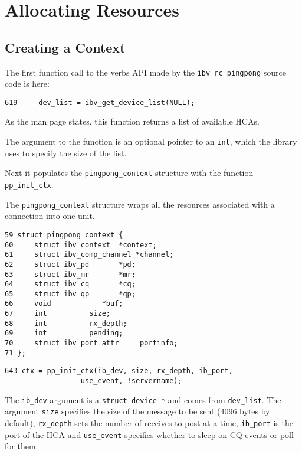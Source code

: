 \documentclass[letterpaper,12pt]{article}
\begin{document}
\section{Allocating Resources}

\subsection{Creating a Context} The first function call to the verbs API
made by the {\tt ibv\_rc\_pingpong} source code is here:

\lstset{language=C, caption=,basicstyle=\footnotesize}
\begin{lstlisting}
619     dev_list = ibv_get_device_list(NULL);
\end{lstlisting}

As the man page states, this function returns a list of available HCAs.

The argument to the function is an optional pointer to an {\tt int},
which the library uses to specify the size of the list.

Next it populates the {\tt pingpong\_context} structure with the function
{\tt pp\_init\_ctx}.

The {\tt pingpong\_context} structure wraps all the resources associated with
a connection into one unit.

\lstset{language=C, caption=struct pingpong\_context}
\begin{lstlisting}
59 struct pingpong_context {
60     struct ibv_context  *context;
61     struct ibv_comp_channel *channel;
62     struct ibv_pd       *pd;
63     struct ibv_mr       *mr;
64     struct ibv_cq       *cq;
65     struct ibv_qp       *qp;
66     void            *buf;
67     int          size;
68     int          rx_depth;
69     int          pending;
70     struct ibv_port_attr     portinfo;
71 };
\end{lstlisting}


\lstset{language=C, caption=Initializing the struct pingpong\_context}
\begin{lstlisting}
643 ctx = pp_init_ctx(ib_dev, size, rx_depth, ib_port,
			      use_event, !servername);
\end{lstlisting}

The {\tt ib\_dev} argument is a {\tt struct device *} and comes from {\tt dev\_list}. The argument
{\tt size} specifies the size of the message to be sent (4096 bytes by
default), {\tt rx\_depth}
sets the number of receives to post at a time, {\tt ib\_port} is the port of the HCA and {\tt use\_event}
specifies whether to sleep on CQ events or poll for them.
\end{document}
